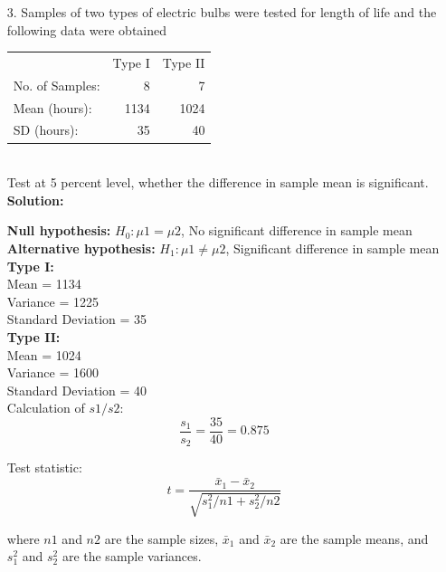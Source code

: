 \documentclass[a4paper,11pt,openright]{report}
\begin{document}
\begin{enumerate}
\item[3.] Samples of two types of electric bulbs were tested for length of life and the
following data were obtained \\
\begin{tabular}{lrr}
		& Type I & Type II \\
No. of Samples: & 8 & 7 \\
Mean (hours):   & 1134 & 1024 \\
SD (hours):     & 35 & 40 \\
\end{tabular} \\
Test at 5 percent level, whether the difference in sample mean is significant. \\

\textbf{Solution:}

\textbf{Null hypothesis:} $H_{0}: \mu 1 = \mu 2$, No significant difference in sample mean
\\
\textbf{Alternative hypothesis:} $H_{1}: \mu 1 \neq \mu 2$, Significant difference in sample
mean \\

\textbf{Type I:} \\
\hspace*{10mm} Mean = 1134 \\
\hspace*{10mm} Variance = 1225 \\
\hspace*{10mm} Standard Deviation = 35 \\

\textbf{Type II:} \\
\hspace*{10mm} Mean = 1024 \\
\hspace*{10mm} Variance = 1600 \\
\hspace*{10mm} Standard Deviation = 40 \\

Calculation of $s1/s2$:
\begin{equation*}
\frac{s_{1}}{s_{2}} = \frac{35}{40} = 0.875
\end{equation*}

Test statistic: 
\begin{equation*}
t = \frac{\bar x_{1} - \bar x_{2}}{\sqrt{s_{1}^{2}/n1 + s_{2}^{2}/n2}}
\end{equation*}

where $n1$ and $n2$ are the sample sizes, $\bar x_{1}$ and $\bar x_{2}$ are the sample
means, and $s_{1}^{2}$ and $s_{2}^{2}$ are the sample variances. 


\end{enumerate}
\end{document}
